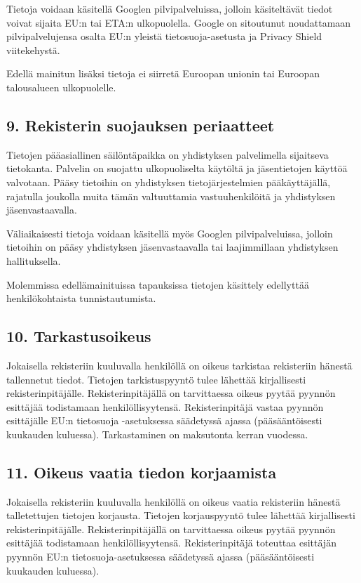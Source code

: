 \documentclass[finnish]{tktltiki}
\begin{document}
Tietoja voidaan käsitellä Googlen pilvipalveluissa, jolloin käsiteltävät tiedot voivat sijaita EU:n tai ETA:n ulkopuolella. Google on sitoutunut noudattamaan pilvipalvelujensa osalta EU:n yleistä tietosuoja-asetusta ja Privacy Shield viitekehystä.

Edellä mainitun lisäksi tietoja ei siirretä Euroopan unionin tai Euroopan talousalueen ulkopuolelle.

\subsection*{9. Rekisterin suojauksen periaatteet}

Tietojen pääasiallinen säilöntäpaikka on yhdistyksen palvelimella sijaitseva tietokanta. Palvelin on suojattu ulkopuoliselta käytöltä ja jäsentietojen käyttöä valvotaan. Pääsy tietoihin on yhdistyksen tietojärjestelmien pääkäyttäjällä, rajatulla joukolla muita tämän valtuuttamia vastuuhenkilöitä ja yhdistyksen jäsenvastaavalla.

Väliaikaisesti tietoja voidaan käsitellä myös Googlen pilvipalveluissa, jolloin tietoihin on pääsy yhdistyksen jäsenvastaavalla tai laajimmillaan yhdistyksen hallituksella.

Molemmissa edellämainituissa tapauksissa tietojen käsittely edellyttää henkilökohtaista tunnistautumista.

\subsection*{10. Tarkastusoikeus}

Jokaisella rekisteriin kuuluvalla henkilöllä on oikeus tarkistaa rekisteriin hänestä tallennetut tiedot. Tietojen tarkistuspyyntö tulee lähettää kirjallisesti rekisterinpitäjälle. Rekisterinpitäjällä on tarvittaessa oikeus pyytää pyynnön esittäjää todistamaan henkilöllisyytensä. Rekisterinpitäjä vastaa pyynnön esittäjälle EU:n tietosuoja -asetuksessa säädetyssä ajassa (pääsääntöisesti kuukauden kuluessa). Tarkastaminen on maksutonta kerran vuodessa.

\subsection*{11. Oikeus vaatia tiedon korjaamista}

Jokaisella rekisteriin kuuluvalla henkilöllä on oikeus vaatia rekisteriin hänestä talletettujen tietojen korjausta. Tietojen korjauspyyntö tulee lähettää kirjallisesti rekisterinpitäjälle. Rekisterinpitäjällä on tarvittaessa oikeus pyytää pyynnön esittäjää todistamaan henkilöllisyytensä. Rekisterinpitäjä toteuttaa esittäjän pyynnön EU:n tietosuoja-asetuksessa säädetyssä ajassa (pääsääntöisesti kuukauden kuluessa).
\end{document}
